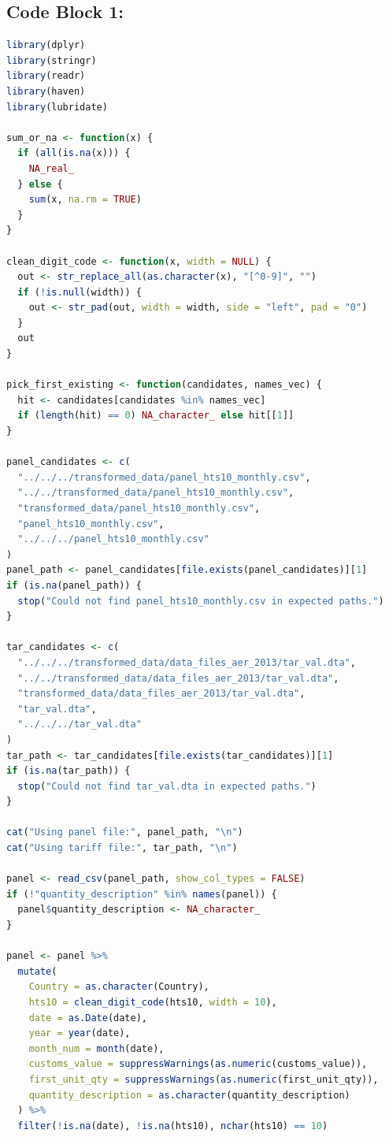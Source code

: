 \subsection*{Code Block 1: \texttt{}}
\begin{lstlisting}[language=R]
library(dplyr)
library(stringr)
library(readr)
library(haven)
library(lubridate)

sum_or_na <- function(x) {
  if (all(is.na(x))) {
    NA_real_
  } else {
    sum(x, na.rm = TRUE)
  }
}

clean_digit_code <- function(x, width = NULL) {
  out <- str_replace_all(as.character(x), "[^0-9]", "")
  if (!is.null(width)) {
    out <- str_pad(out, width = width, side = "left", pad = "0")
  }
  out
}

pick_first_existing <- function(candidates, names_vec) {
  hit <- candidates[candidates %in% names_vec]
  if (length(hit) == 0) NA_character_ else hit[[1]]
}

panel_candidates <- c(
  "../../../transformed_data/panel_hts10_monthly.csv",
  "../../transformed_data/panel_hts10_monthly.csv",
  "transformed_data/panel_hts10_monthly.csv",
  "panel_hts10_monthly.csv",
  "../../../panel_hts10_monthly.csv"
)
panel_path <- panel_candidates[file.exists(panel_candidates)][1]
if (is.na(panel_path)) {
  stop("Could not find panel_hts10_monthly.csv in expected paths.")
}

tar_candidates <- c(
  "../../../transformed_data/data_files_aer_2013/tar_val.dta",
  "../../transformed_data/data_files_aer_2013/tar_val.dta",
  "transformed_data/data_files_aer_2013/tar_val.dta",
  "tar_val.dta",
  "../../../tar_val.dta"
)
tar_path <- tar_candidates[file.exists(tar_candidates)][1]
if (is.na(tar_path)) {
  stop("Could not find tar_val.dta in expected paths.")
}

cat("Using panel file:", panel_path, "\n")
cat("Using tariff file:", tar_path, "\n")

panel <- read_csv(panel_path, show_col_types = FALSE)
if (!"quantity_description" %in% names(panel)) {
  panel$quantity_description <- NA_character_
}

panel <- panel %>%
  mutate(
    Country = as.character(Country),
    hts10 = clean_digit_code(hts10, width = 10),
    date = as.Date(date),
    year = year(date),
    month_num = month(date),
    customs_value = suppressWarnings(as.numeric(customs_value)),
    first_unit_qty = suppressWarnings(as.numeric(first_unit_qty)),
    quantity_description = as.character(quantity_description)
  ) %>%
  filter(!is.na(date), !is.na(hts10), nchar(hts10) == 10)


\end{lstlisting}
